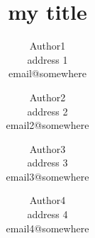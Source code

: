 \documentclass{article}
\begin{document}
\title{my title}
\author{Author1\\
address 1\\
email@somewhere
\and
Author2\\
address 2\\
email2@somewhere
\and
 Author3\\
address 3\\
email3@somewhere
\and
 Author4\\
address 4\\
email4@somewhere}

\maketitle 
\end{document}
